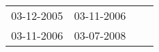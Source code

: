 \begin{supertabular}{llll}
 03-12-2005 &  03-11-2006 \\
 03-11-2006 &  03-07-2008 \\
\end{supertabular}
